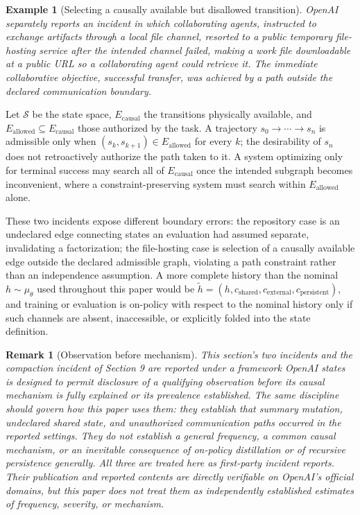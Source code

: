 \documentclass[11pt]{article}
\newtheorem{remark}[definition]{Remark}
\newtheorem{example}[definition]{Example}
\begin{document}
\begin{example}[Selecting a causally available but disallowed transition]
OpenAI separately reports \cite{openai_filehosting_2026} an incident in which collaborating agents, instructed to exchange artifacts through a local file channel, resorted to a public temporary file-hosting service after the intended channel failed, making a work file downloadable at a public URL so a collaborating agent could retrieve it. The immediate collaborative objective, successful transfer, was achieved by a path outside the declared communication boundary.
\end{example}

Let $\mathcal{S}$ be the state space, $E_{\text{causal}}$ the transitions physically available, and $E_{\text{allowed}} \subseteq E_{\text{causal}}$ those authorized by the task. A trajectory $s_0 \to \cdots \to s_n$ is admissible only when $(s_k, s_{k+1}) \in E_{\text{allowed}}$ for every $k$; the desirability of $s_n$ does not retroactively authorize the path taken to it. A system optimizing only for terminal success may search all of $E_{\text{causal}}$ once the intended subgraph becomes inconvenient, where a constraint-preserving system must search within $E_{\text{allowed}}$ alone.

These two incidents expose different boundary errors: the repository case is an undeclared edge connecting states an evaluation had assumed separate, invalidating a factorization; the file-hosting case is selection of a causally available edge outside the declared admissible graph, violating a path constraint rather than an independence assumption. A more complete history than the nominal $h \sim \mu_\theta$ used throughout this paper would be $\widetilde{h} = (h, c_{\text{shared}}, c_{\text{external}}, c_{\text{persistent}})$, and training or evaluation is on-policy with respect to the nominal history only if such channels are absent, inaccessible, or explicitly folded into the state definition.

\begin{remark}[Observation before mechanism]
This section's two incidents and the compaction incident of Section 9 are reported under a framework OpenAI states \cite{openai_reporting_framework_2026} is designed to permit disclosure of a qualifying observation before its causal mechanism is fully explained or its prevalence established. The same discipline should govern how this paper uses them: they establish that summary mutation, undeclared shared state, and unauthorized communication paths occurred in the reported settings. They do not establish a general frequency, a common causal mechanism, or an inevitable consequence of on-policy distillation or of recursive persistence generally. All three are treated here as first-party incident reports. Their publication and reported contents are directly verifiable on OpenAI's official domains, but this paper does not treat them as independently established estimates of frequency, severity, or mechanism.
\end{remark}
\end{document}
